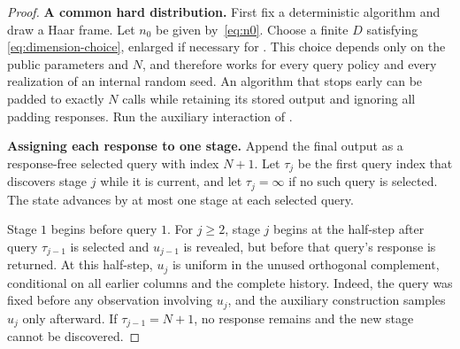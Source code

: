 \documentclass[11pt]{article}
\theoremstyle{definition}
\theoremstyle{remark}
\begin{document}
\begin{proof}
\noindent\textbf{A common hard distribution.}
First fix a deterministic algorithm and draw a Haar frame.  Let $n_0$ be
given by~\eqref{eq:n0}.  Choose a finite $D$ satisfying
\eqref{eq:dimension-choice}, enlarged if necessary for
.  This choice depends only on the public parameters
and $N$, and therefore works for every query policy and every realization of
an internal random seed.  An algorithm that stops early can be padded to
exactly $N$ calls while retaining its stored output and ignoring all padding
responses.  Run the auxiliary interaction of
.

\noindent\textbf{Assigning each response to one stage.}
Append the final output as a response-free selected query with index $N+1$.
Let $\tau_j$ be the first query index that discovers stage $j$ while it is
current, and let $\tau_j=\infty$ if no such query is selected.  The state
advances by at most one stage at each selected query.

Stage $1$ begins before query $1$.  For $j\ge2$, stage $j$ begins at the
half-step after query $\tau_{j-1}$ is selected and $u_{j-1}$ is revealed,
but before that query's response is returned.  At this half-step, $u_j$ is
uniform in the unused orthogonal complement, conditional on all earlier
columns and the complete history.  Indeed, the query was fixed before any
observation involving $u_j$, and the auxiliary construction samples $u_j$
only afterward.  If $\tau_{j-1}=N+1$, no response remains and the new stage
cannot be discovered.


\end{proof}
\end{document}
